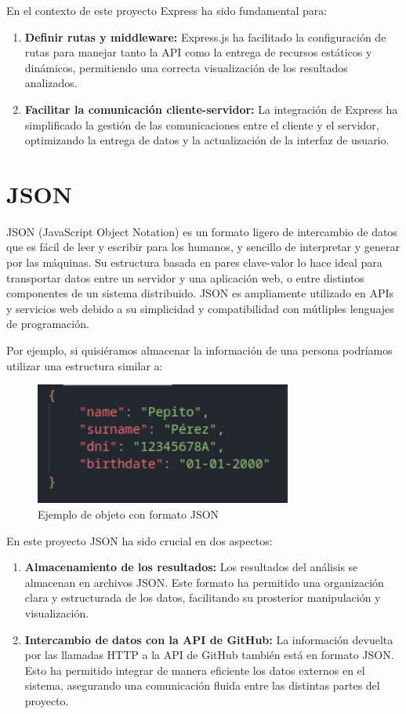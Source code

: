 \documentclass[a4paper, 12pt]{book}
\begin{document}
En el contexto de este proyecto Express ha sido fundamental para:

\begin{enumerate}
    \item \textbf{Definir rutas y middleware:} Express.js ha facilitado la configuración de rutas para manejar tanto la API como la entrega de recursos estáticos y dinámicos, permitiendo una correcta visualización de los resultados analizados.
    \item \textbf{Facilitar la comunicación cliente-servidor:} La integración de Express ha simplificado la gestión de las comunicaciones entre el cliente y el servidor, optimizando la entrega de datos y la actualización de la interfaz de usuario.
\end{enumerate}

\section{JSON}
JSON (JavaScript Object Notation) es un formato ligero de intercambio de datos que es fácil de leer y escribir para los humanos, y sencillo de interpretar y generar por las máquinas. Su estructura basada en pares clave-valor lo hace ideal para transportar datos entre un servidor y una aplicación web, o entre distintos componentes de un sistema distribuido. JSON es ampliamente utilizado en APIs y servicios web debido a su simplicidad y compatibilidad con mútliples lenguajes de programación.

Por ejemplo, si quisiéramos almacenar la información de una persona podríamos utilizar una estructura similar a:

\begin{figure} [h]
    \centering
    \includegraphics[height=4cm, keepaspectratio]{img/example_json.png}
    \caption{Ejemplo de objeto con formato JSON}
    \label{fig:enter-label}
\end{figure}

En este proyecto JSON ha sido crucial en dos aspectos:

\begin{enumerate}
    \item \textbf{Almacenamiento de los resultados:} Los resultados del análisis se almacenan en archivos JSON. Este formato ha permitido una organización clara y estructurada de los datos, facilitando su prosterior manipulación y visualización.
    \item \textbf{Intercambio de datos con la API de GitHub:} La información devuelta por las llamadas HTTP a la API de GitHub también está en formato JSON. Esto ha permitido integrar de manera eficiente los datos externos en el sistema, asegurando una comunicación fluida entre las distintas partes del proyecto.
\end{enumerate}
\end{document}
